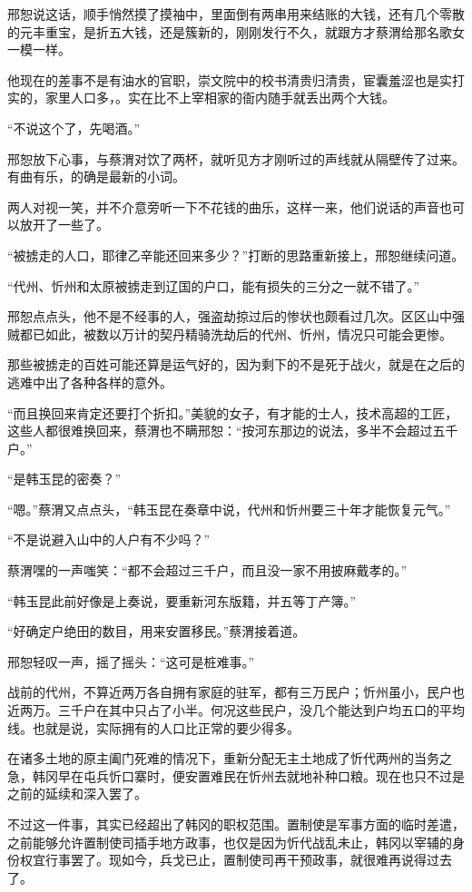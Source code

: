 邢恕说这话，顺手悄然摸了摸袖中，里面倒有两串用来结账的大钱，还有几个零散的元丰重宝，是折五大钱，还是簇新的，刚刚发行不久，就跟方才蔡渭给那名歌女一模一样。

他现在的差事不是有油水的官职，崇文院中的校书清贵归清贵，宦囊羞涩也是实打实的，家里人口多，。实在比不上宰相家的衙内随手就丢出两个大钱。

“不说这个了，先喝酒。”

邢恕放下心事，与蔡渭对饮了两杯，就听见方才刚听过的声线就从隔壁传了过来。有曲有乐，的确是最新的小词。

两人对视一笑，并不介意旁听一下不花钱的曲乐，这样一来，他们说话的声音也可以放开了一些了。

“被掳走的人口，耶律乙辛能还回来多少？”打断的思路重新接上，邢恕继续问道。

“代州、忻州和太原被掳走到辽国的户口，能有损失的三分之一就不错了。”

邢恕点点头，他不是不经事的人，强盗劫掠过后的惨状也颇看过几次。区区山中强贼都已如此，被数以万计的契丹精骑洗劫后的代州、忻州，情况只可能会更惨。

那些被掳走的百姓可能还算是运气好的，因为剩下的不是死于战火，就是在之后的逃难中出了各种各样的意外。

“而且换回来肯定还要打个折扣。”美貌的女子，有才能的士人，技术高超的工匠，这些人都很难换回来，蔡渭也不瞒邢恕：“按河东那边的说法，多半不会超过五千户。”

“是韩玉昆的密奏？”

“嗯。”蔡渭又点点头，“韩玉昆在奏章中说，代州和忻州要三十年才能恢复元气。”

“不是说避入山中的人户有不少吗？”

蔡渭嘿的一声嗤笑：“都不会超过三千户，而且没一家不用披麻戴孝的。”

“韩玉昆此前好像是上奏说，要重新河东版籍，并五等丁产簿。”

“好确定户绝田的数目，用来安置移民。”蔡渭接着道。

邢恕轻叹一声，摇了摇头：“这可是桩难事。”

战前的代州，不算近两万各自拥有家庭的驻军，都有三万民户；忻州虽小，民户也近两万。三千户在其中只占了小半。何况这些民户，没几个能达到户均五口的平均线。也就是说，实际拥有的人口比正常的要少得多。

在诸多土地的原主阖门死难的情况下，重新分配无主土地成了忻代两州的当务之急，韩冈早在屯兵忻口寨时，便安置难民在忻州去就地补种口粮。现在也只不过是之前的延续和深入罢了。

不过这一件事，其实已经超出了韩冈的职权范围。置制使是军事方面的临时差遣，之前能够允许置制使司插手地方政事，也仅是因为忻代战乱未止，韩冈以宰辅的身份权宜行事罢了。现如今，兵戈已止，置制使司再干预政事，就很难再说得过去了。

